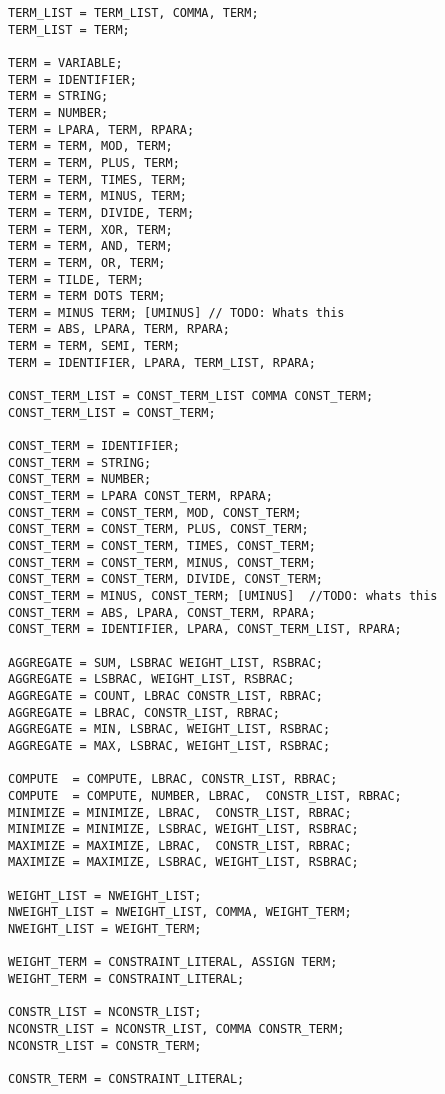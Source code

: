\begin{verbatim}
TERM_LIST = TERM_LIST, COMMA, TERM;
TERM_LIST = TERM;

TERM = VARIABLE;
TERM = IDENTIFIER;
TERM = STRING;
TERM = NUMBER;
TERM = LPARA, TERM, RPARA;
TERM = TERM, MOD, TERM;
TERM = TERM, PLUS, TERM;
TERM = TERM, TIMES, TERM;
TERM = TERM, MINUS, TERM;
TERM = TERM, DIVIDE, TERM;
TERM = TERM, XOR, TERM;
TERM = TERM, AND, TERM;
TERM = TERM, OR, TERM;
TERM = TILDE, TERM;
TERM = TERM DOTS TERM;
TERM = MINUS TERM; [UMINUS] // TODO: Whats this
TERM = ABS, LPARA, TERM, RPARA;
TERM = TERM, SEMI, TERM;
TERM = IDENTIFIER, LPARA, TERM_LIST, RPARA;

CONST_TERM_LIST = CONST_TERM_LIST COMMA CONST_TERM;
CONST_TERM_LIST = CONST_TERM;

CONST_TERM = IDENTIFIER;
CONST_TERM = STRING;
CONST_TERM = NUMBER;
CONST_TERM = LPARA CONST_TERM, RPARA;
CONST_TERM = CONST_TERM, MOD, CONST_TERM;
CONST_TERM = CONST_TERM, PLUS, CONST_TERM;
CONST_TERM = CONST_TERM, TIMES, CONST_TERM;
CONST_TERM = CONST_TERM, MINUS, CONST_TERM;
CONST_TERM = CONST_TERM, DIVIDE, CONST_TERM;
CONST_TERM = MINUS, CONST_TERM; [UMINUS]  //TODO: whats this
CONST_TERM = ABS, LPARA, CONST_TERM, RPARA;
CONST_TERM = IDENTIFIER, LPARA, CONST_TERM_LIST, RPARA;

AGGREGATE = SUM, LSBRAC WEIGHT_LIST, RSBRAC;
AGGREGATE = LSBRAC, WEIGHT_LIST, RSBRAC;
AGGREGATE = COUNT, LBRAC CONSTR_LIST, RBRAC;
AGGREGATE = LBRAC, CONSTR_LIST, RBRAC;
AGGREGATE = MIN, LSBRAC, WEIGHT_LIST, RSBRAC;
AGGREGATE = MAX, LSBRAC, WEIGHT_LIST, RSBRAC;

COMPUTE  = COMPUTE, LBRAC, CONSTR_LIST, RBRAC;
COMPUTE  = COMPUTE, NUMBER, LBRAC,  CONSTR_LIST, RBRAC;
MINIMIZE = MINIMIZE, LBRAC,  CONSTR_LIST, RBRAC;
MINIMIZE = MINIMIZE, LSBRAC, WEIGHT_LIST, RSBRAC;
MAXIMIZE = MAXIMIZE, LBRAC,  CONSTR_LIST, RBRAC;
MAXIMIZE = MAXIMIZE, LSBRAC, WEIGHT_LIST, RSBRAC;

WEIGHT_LIST = NWEIGHT_LIST;
NWEIGHT_LIST = NWEIGHT_LIST, COMMA, WEIGHT_TERM;
NWEIGHT_LIST = WEIGHT_TERM;

WEIGHT_TERM = CONSTRAINT_LITERAL, ASSIGN TERM;
WEIGHT_TERM = CONSTRAINT_LITERAL;

CONSTR_LIST = NCONSTR_LIST;
NCONSTR_LIST = NCONSTR_LIST, COMMA CONSTR_TERM;
NCONSTR_LIST = CONSTR_TERM;

CONSTR_TERM = CONSTRAINT_LITERAL;
\end{verbatim}